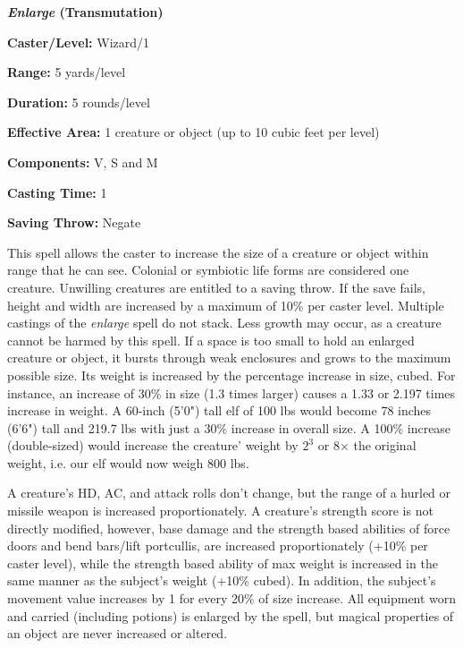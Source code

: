 \begin{multicols}{2}
\columnbreak

\vspace{1em}

\noindent
\begin{minipage}{\columnwidth}

\noindent \textbf{\textit{Enlarge} (Transmutation)}

\noindent \textbf{Caster/Level:} Wizard/1

\noindent \textbf{Range:} 5 yards/level

\noindent \textbf{Duration:} 5 rounds/level

\noindent \textbf{Effective Area:} 1 creature or object (up to 10 cubic feet per level)

\noindent \textbf{Components:} V, S and M

\noindent \textbf{Casting Time:} 1

\noindent \textbf{Saving Throw:} Negate

\end{minipage}

This spell allows the caster to increase the size of a creature or object within range that he can see.  Colonial or symbiotic life forms are considered one creature.  Unwilling creatures are entitled to a saving throw.  If the save fails, height and width are increased by a maximum of 10\% per caster level.  Multiple castings of the \textit{enlarge} spell do not stack.  Less growth may occur, as a creature cannot be harmed by this spell.  If a space is too small to hold an enlarged creature or object, it bursts through weak enclosures and grows to the maximum possible size.  Its weight is increased by the percentage increase in size, cubed.  For instance, an increase of 30\% in size (1.3 times larger) causes a 1.33 or 2.197 times increase in weight.  A 60-inch (5'0") tall elf of 100 lbs would become 78 inches (6'6") tall and 219.7 lbs with just a 30\% increase in overall size.  A 100\% increase (double-sized) would increase the creature' weight by $2^3$ or 8$\times$ the original weight, i.e. our elf would now weigh 800 lbs.

A creature's HD, AC, and attack rolls don't change, but the range of a hurled or missile weapon is increased proportionately.  A creature's strength score is not directly modified, however, base damage and the strength based abilities of force doors and bend bars/lift portcullis, are increased proportionately (+10\% per caster level), while the strength based ability of max weight is increased in the same manner as the subject's weight (+10\% cubed).  In addition, the subject's movement value increases by 1 for every 20\% of size increase.  All equipment worn and carried (including potions) is enlarged by the spell, but magical properties of an object are never increased or altered.  


\end{multicols}
